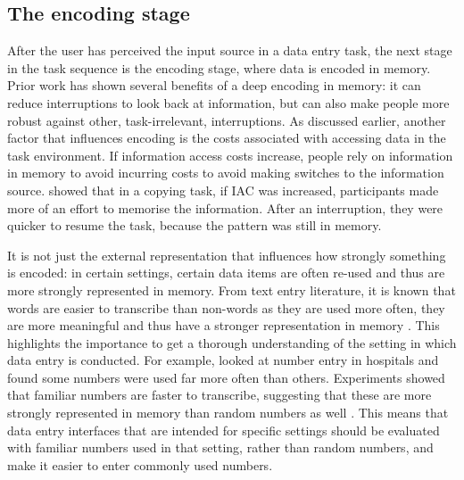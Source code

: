 
\subsection{The encoding stage}\label{sec:Encoding_stage}
After the user has perceived the input source in a data entry task, the next stage in the task sequence is the encoding stage, where data is encoded in memory. Prior work has shown several benefits of a deep encoding in memory: it can reduce interruptions to look back at information, but can also make people more robust against other, task-irrelevant, interruptions. As discussed earlier, another factor that  influences encoding is the costs associated with accessing data in the task environment. If information access costs increase, people rely on information in memory to avoid incurring costs to avoid making switches to the information source. \citet{Morgan2009} showed that in a copying task, if IAC was increased, participants made more of an effort to memorise the information. After an interruption, they were quicker to resume the task, because the pattern was still in memory. 

It is not just the external representation that influences how strongly something is encoded: in certain settings, certain data items are often re-used and thus are more strongly represented in memory. From text entry literature, it is known that words are easier to transcribe than non-words as they are used more often, they are more meaningful and thus have a stronger representation in memory \citep{Salthouse1986}. This highlights the importance to get a thorough understanding of the setting in which data entry is conducted. For example, \citet{Wiseman2013a} looked at number entry in hospitals and found some numbers were used far more often than others. Experiments showed that familiar numbers are faster to transcribe, suggesting that these are more strongly represented in memory than random numbers as well \citep{Wiseman2014} . This means that data entry interfaces that are intended for specific settings should be evaluated with familiar numbers used in that setting, rather than random numbers, and make it easier to enter commonly used numbers. 

